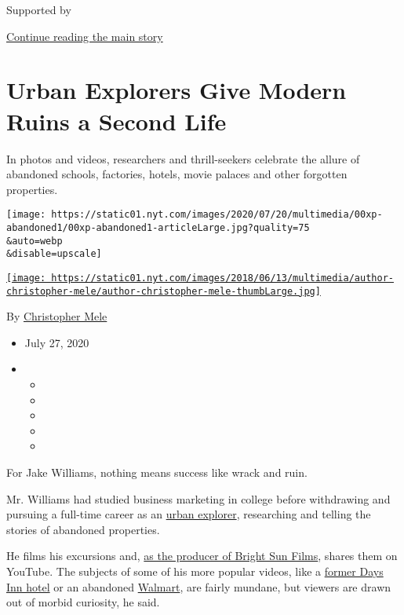 Supported by

\protect\hyperlink{after-sponsor}{Continue reading the main story}

\hypertarget{urban-explorers-give-modern-ruins-a-second-life}{%
\section{Urban Explorers Give Modern Ruins a Second
Life}\label{urban-explorers-give-modern-ruins-a-second-life}}

In photos and videos, researchers and thrill-seekers celebrate the
allure of abandoned schools, factories, hotels, movie palaces and other
forgotten properties.

\texttt{[image: https://static01.nyt.com/images/2020/07/20/multimedia/00xp-abandoned1/00xp-abandoned1-articleLarge.jpg?quality=75\\\&auto=webp\\\&disable=upscale]}

\href{https://www.nytimes.com/by/christopher-mele}{\texttt{[image: https://static01.nyt.com/images/2018/06/13/multimedia/author-christopher-mele/author-christopher-mele-thumbLarge.jpg]}}

By \href{https://www.nytimes.com/by/christopher-mele}{Christopher Mele}

\begin{itemize}
\item
  July 27, 2020
\item
  \begin{itemize}
  \item
  \item
  \item
  \item
  \item
  \end{itemize}
\end{itemize}

For Jake Williams, nothing means success like wrack and ruin.

Mr. Williams had studied business marketing in college before
withdrawing and pursuing a full-time career as an
\href{http://www.forbidden-places.net/why.php}{urban explorer},
researching and telling the stories of abandoned properties.

He films his excursions and,
\href{https://www.youtube.com/channel/UC5k3Kc0avyDJ2nG9Kxm9JmQ}{as the
producer of Bright Sun Films}, shares them on YouTube. The subjects of
some of his more popular videos, like a
\href{https://www.youtube.com/watch?v=3gJfEOx_NGA}{former Days Inn
hotel} or an abandoned
\href{https://www.youtube.com/watch?v=Mr1CWRc174o}{Walmart}, are fairly
mundane, but viewers are drawn out of morbid curiosity, he said.

